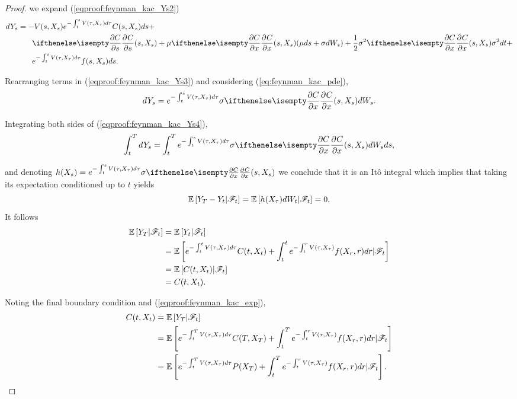 \documentclass[../TGMAFFIRO.tex]{subfiles}
\begin{document}
\begin{proof}
we expand (\ref{eqproof:feynman_kac_Ys2}) 
\begin{align}
  dY_s &= -V(s, X_s)e^{-\int_t^s V(\tau, X_\tau) d\tau}C(s, X_s) ds + \nonumber \\
   &\phantom{{}=1} \partialwrt{C}{s}{(s, X_s)} + \mu\partialwrt{C}{x}{(s, X_s)}(\mu ds + \sigma dW_s) + \frac{1}{2}\sigma^2\partialwrt{C}{x}{(s, X_s)} \sigma^2 dt\nonumber + \\
   &\phantom{{}=1} e^{-\int_t^s V(\tau, X_\tau)d\tau}f(s, X_s) ds\label{eqproof:feynman_kac_Ys3}.
\end{align}

Rearranging terms in (\ref{eqproof:feynman_kac_Ys3}) and considering (\ref{eq:feynman_kac_pde}),
\begin{equation}
	dY_s =e^{-\int_t^s V(\tau, X_\tau) d\tau} \sigma \partialwrt{C}{x}{(s, X_s)}dW_s \label{eqproof:feynman_kac_Ys4}.
\end{equation}

Integrating both sides of (\ref{eqproof:feynman_kac_Ys4}),
\begin{equation}
  \int_t^T dY_s =\int_t^T e^{-\int_t^s V(\tau, X_\tau) d\tau} \sigma \partialwrt{C}{x}{(s, X_s)}dW_s ds,
\end{equation}

and denoting $h(X_s) = e^{-\int_t^s V(\tau, X_\tau) d\tau} \sigma \partialwrt{C}{x}{(s, X_s)}$ we conclude that it is an It\^o integral which implies that taking its expectation conditioned up to $t$ yields
\begin{equation}
  \mathbb{E}\left[Y_T - Y_t|\mathscr{F}_t\right] = \mathbb{E}\left[h(X_\tau) dW_t|\mathscr{F}_t\right] = 0.
\end{equation}
It follows
\begin{align}
	\mathbb{E}\left[Y_T|\mathscr{F}_t\right] &= \mathbb{E}\left[Y_t|\mathscr{F}_t\right]\nonumber\\
	&= \mathbb{E}\left[e^{-\int_t^t V(\tau, X_\tau) d\tau}C(t, X_t) + \int_t^t e^{-\int_t^rV(\tau, X_\tau)}f(X_r, r) dr|\mathscr{F}_t\right]\nonumber\\
	&= \mathbb{E}\left[C(t, X_t)|\mathscr{F}_t\right]\nonumber\\
	&= C(t, X_t).\label{eqproof:feynman_kac_exp}
\end{align}

Noting the final boundary condition and (\ref{eqproof:feynman_kac_exp}),
\begin{align}
  C(t, X_t) &= \mathbb{E}\left[Y_T|\mathscr{F}_t\right] \nonumber\\
  	&= \mathbb{E}\left[e^{-\int_t^T V(\tau, X_\tau) d\tau}C(T, X_T) + \int_t^T e^{-\int_t^rV(\tau, X_\tau)}f(X_r, r) dr|\mathscr{F}_t\right]\nonumber\\
  	&= \mathbb{E}\left[e^{-\int_t^T V(\tau, X_\tau) d\tau}P(X_T) + \int_t^T e^{-\int_t^rV(\tau, X_\tau)}f(X_r, r) dr|\mathscr{F}_t\right]\nonumber.
\end{align}
\end{proof}
\end{document}
